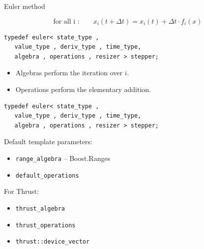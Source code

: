 \begin{frame}[fragile]


 \vspace{2ex}

Euler method

$$\text{for all i :}  \quad \quad x_i(t+\Delta t) = x_i(t) + \Delta t \cdot f_i(x)$$

\vspace{2ex}

\begin{lstlisting}
typedef euler< state_type ,
   value_type , deriv_type , time_type,
   algebra , operations , resizer > stepper; 
\end{lstlisting}


\begin{itemize}
\item Algebras perform the iteration over $i$.
\item Operations perform the elementary addition.
\end{itemize}


\end{frame}

\begin{frame}[fragile]


\begin{lstlisting}
typedef euler< state_type ,
   value_type , deriv_type , time_type,
   algebra , operations , resizer > stepper; 
\end{lstlisting}

Default template parameters:

\begin{itemize}
 \item {\tt range\_algebra} -- Boost.Ranges
 \item {\tt default\_operations}
\end{itemize}

\vspace{2ex}
For Thrust:

\begin{itemize}
 \item {\tt thrust\_algebra}
 \item {\tt thrust\_operations}
 \item {\tt thrust::device\_vector}
\end{itemize}

 
\end{frame}







